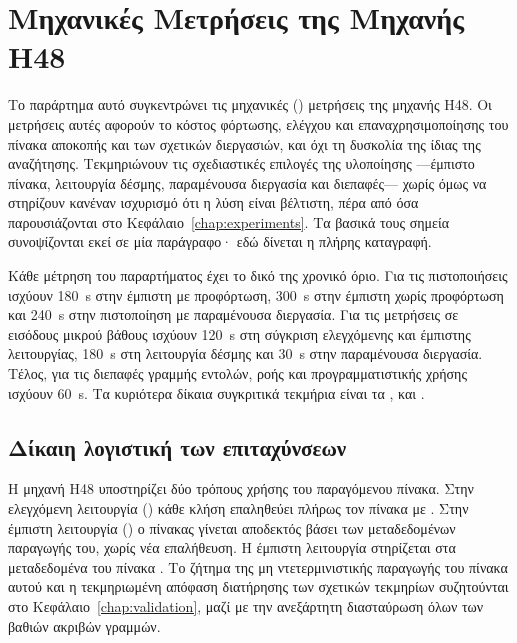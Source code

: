 \chapter{Μηχανικές Μετρήσεις της Μηχανής H48}
\label{app:h48eng}

Το παράρτημα αυτό συγκεντρώνει τις μηχανικές () μετρήσεις της μηχανής H48. Οι μετρήσεις αυτές αφορούν το κόστος φόρτωσης, ελέγχου και επαναχρησιμοποίησης του πίνακα αποκοπής και των σχετικών διεργασιών, και όχι τη δυσκολία της ίδιας της αναζήτησης. Τεκμηριώνουν τις σχεδιαστικές επιλογές της υλοποίησης —έμπιστο πίνακα, λειτουργία δέσμης, παραμένουσα διεργασία και διεπαφές— χωρίς όμως να στηρίζουν κανέναν ισχυρισμό ότι η λύση είναι βέλτιστη, πέρα από όσα παρουσιάζονται στο Κεφάλαιο~\ref{chap:experiments}. Τα βασικά τους σημεία συνοψίζονται εκεί σε μία παράγραφο· εδώ δίνεται η πλήρης καταγραφή.

Κάθε μέτρηση του παραρτήματος έχει το δικό της χρονικό όριο. Για τις πιστοποιήσεις ισχύουν 180~s στην έμπιστη με προφόρτωση, 300~s στην έμπιστη χωρίς προφόρτωση και 240~s στην πιστοποίηση με παραμένουσα διεργασία. Για τις μετρήσεις σε εισόδους μικρού βάθους ισχύουν 120~s στη σύγκριση ελεγχόμενης και έμπιστης λειτουργίας, 180~s στη λειτουργία δέσμης και 30~s στην παραμένουσα διεργασία. Τέλος, για τις διεπαφές γραμμής εντολών, ροής και προγραμματιστικής χρήσης ισχύουν 60~s. Τα κυριότερα δίκαια συγκριτικά τεκμήρια είναι τα ,  και .

\section{Δίκαιη λογιστική των επιταχύνσεων}
\label{sec:experiments-h48-fair}

Η μηχανή H48 υποστηρίζει δύο τρόπους χρήσης του παραγόμενου πίνακα. Στην ελεγχόμενη λειτουργία () κάθε κλήση επαληθεύει πλήρως τον πίνακα με . Στην έμπιστη λειτουργία () ο πίνακας γίνεται αποδεκτός βάσει των μεταδεδομένων παραγωγής του, χωρίς νέα επαλήθευση. Η έμπιστη λειτουργία στηρίζεται στα μεταδεδομένα του πίνακα . Το ζήτημα της μη ντετερμινιστικής παραγωγής του πίνακα αυτού και η τεκμηριωμένη απόφαση διατήρησης των σχετικών τεκμηρίων συζητούνται στο Κεφάλαιο~\ref{chap:validation}, μαζί με την ανεξάρτητη διασταύρωση όλων των βαθιών ακριβών γραμμών.

